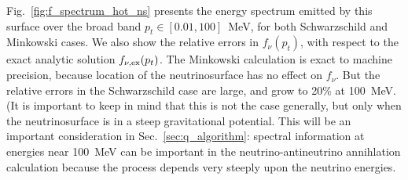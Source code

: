 Fig.~\ref{fig:f_spectrum_hot_ns} presents the energy spectrum emitted by this
surface over the broad band $p_t\in[0.01,100]$~MeV, for both Schwarzschild
and Minkowski cases.
We also show the relative errors in $f_\nu(p_t)$, with respect to the exact analytic
solution $f_{\nu,\rm ex}(p_t)$. The Minkowski calculation is exact to machine
precision, because location of the neutrinosurface has no effect on $f_\nu$.
But the relative errors in the Schwarzschild case are large, and grow to
20\% at 100~MeV. (It is important to keep in mind that this is not the case
generally, but only when the neutrinosurface is in a steep gravitational
potential.
This will be an important consideration in Sec.~\ref{sec:q_algorithm}:
spectral information at energies near 100~MeV can be important in the
neutrino-antineutrino annihlation calculation because the process depends very
steeply upon the neutrino energies.

